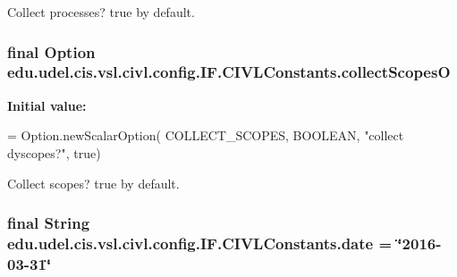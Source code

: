 Collect processes? true by default. 

\hypertarget{classedu_1_1udel_1_1cis_1_1vsl_1_1civl_1_1config_1_1IF_1_1CIVLConstants_a45a3e47fe0b95159e3408389478f006a}{}
\subsubsection[{collect\+Scopes\+O}]{\setlength{\rightskip}{0pt plus 5cm}final Option edu.\+udel.\+cis.\+vsl.\+civl.\+config.\+I\+F.\+C\+I\+V\+L\+Constants.\+collect\+Scopes\+O\hspace{0.3cm}{\ttfamily [static]}}\label{classedu_1_1udel_1_1cis_1_1vsl_1_1civl_1_1config_1_1IF_1_1CIVLConstants_a45a3e47fe0b95159e3408389478f006a}
{\bfseries Initial value\+:}
\begin{DoxyCode}
= Option.newScalarOption(
            COLLECT\_SCOPES, BOOLEAN, \textcolor{stringliteral}{"collect dyscopes?"}, \textcolor{keyword}{true})
\end{DoxyCode}


Collect scopes? true by default. 

\hypertarget{classedu_1_1udel_1_1cis_1_1vsl_1_1civl_1_1config_1_1IF_1_1CIVLConstants_a8a39e679b5e676271b7dc2f1d2efc2d5}{}
\subsubsection[{date}]{\setlength{\rightskip}{0pt plus 5cm}final String edu.\+udel.\+cis.\+vsl.\+civl.\+config.\+I\+F.\+C\+I\+V\+L\+Constants.\+date = \char`\"{}2016-\/03-\/31\char`\"{}\hspace{0.3cm}{\ttfamily [static]}}\label{classedu_1_1udel_1_1cis_1_1vsl_1_1civl_1_1config_1_1IF_1_1CIVLConstants_a8a39e679b5e676271b7dc2f1d2efc2d5}



